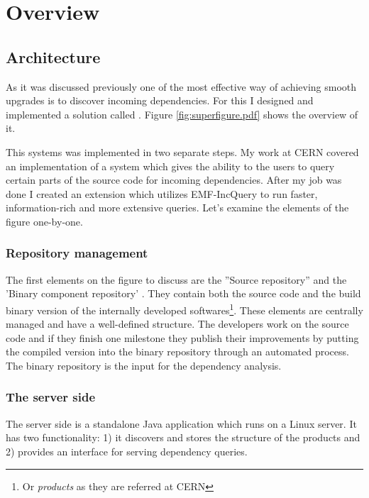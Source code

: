 \chapter{Overview}


\section{Architecture}
As it was discussed previously one of the most effective  way of achieving
smooth upgrades is to discover incoming dependencies. For this I designed and
implemented a solution called \ptool{}.  Figure \autoref{fig:superfigure.pdf} shows the overview of
it.

This systems was implemented in two separate steps. My work at CERN covered an
implementation of a system which gives the ability to the users to query certain
parts of the source code for incoming dependencies. After my job was done I
created an extension which utilizes EMF-IncQuery to run faster, information-rich
and more extensive queries. Let's examine the elements of the figure one-by-one.


\subsection{Repository management}
The first elements on the figure to discuss are the ''Source repository'' and
the 'Binary component repository' . They contain both the source code and the
build binary version of the internally developed softwares\footnote{Or
\textit{products} as they are referred at CERN}. These elements are centrally
managed and have a well-defined structure. The developers work on the source 
code and if they finish one milestone they publish their improvements by putting
the compiled version into the binary repository through an automated process.
The binary repository is the input for the dependency analysis.

\subsection{The server side}
The server side is a standalone Java application which runs on a Linux server.
It has two functionality: 1) it discovers and stores the structure of the
products and 2) provides an interface for serving dependency queries. 

